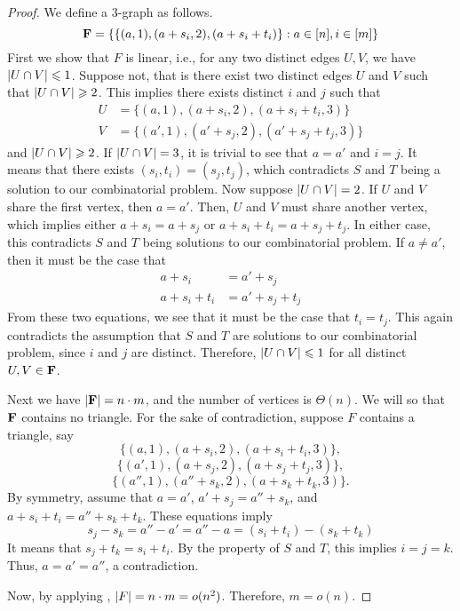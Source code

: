 \begin{proof}
	We define a 3-graph as follows. 
	$$ {\mathbf F} = \{ \{(a,1), (a+s_i, 2), (a + s_i + t_i)\} : a \in [n], i \in [m] \} $$
	First we show that $ F $ is linear, i.e., for any two distinct edges $ U,V $, we have $ \left\vert{U \cap V}\right\vert \leqslant 1 $. Suppose not, that is there exist two distinct edges $U$ and $V$ such that $\abs{U\intersect V} \geq 2$. This implies there exists distinct $i$ and $j$ such that
	\begin{align*}
		U &= \{ (a,1), (a+s_i,2), (a+s_i + t_i, 3) \}\\
		V &= \{ (a',1), (a'+s_j,2), (a'+s_j+t_j,3) \}
	\end{align*}
	and $\left\vert{U\cap V}\right\vert \geqslant 2$. If $\left\vert{U\cap V}\right\vert = 3$, it is trivial to see that $a=a'$ and $i=j$. It means that there exists $(s_i,t_i) = (s_j,t_j)$, which contradicts $S$ and $T$ being a solution to our combinatorial problem. Now suppose $\left\vert{U\cap V}\right\vert = 2$. If $U$ and $V$ share the first vertex, then $a = a'$. Then, $U$ and $V$ must share another vertex, which implies either $a+s_i = a+s_j$ or $a+s_i+t_i = a+s_j+t_j$. In either case, this contradicts $S$ and $T$ being solutions to our combinatorial problem. If $a\neq a'$, then it must be the case that
	\begin{align*}
		a+s_i &= a'+s_j\\
		a+s_i+t_i &= a'+s_j+t_j
	\end{align*}
	From these two equations, we see that it must be the case that $t_i = t_j$. This again contradicts the assumption that $S$ and $T$ are solutions to our combinatorial problem, since $i$ and $j$ are distinct. Therefore, $\left\vert{U\cap V}\right\vert \leqslant 1$ for all distinct $U, V \in {\mathbf F}$.
	
	Next we have $ \left\vert{\ensuremath{{\mathbf F}}}\right\vert = n \cdot m$, and the number of vertices is $ \Theta(n) $. We will so that $ {\mathbf F} $ contains no triangle. For the sake of contradiction, suppose $ F $ contains a triangle, say
	$$  \{ (a, 1), (a+s_i, 2), (a+ s_i + t_i, 3)\}, $$
	$$ \{ (a', 1), (a+s_j, 2), (a+ s_j + t_j, 3)\}, $$
	$$ \{ (a'', 1), (a''+s_k, 2), (a+ s_k + t_k, 3)\}. $$
	By symmetry, assume that $ a = a'$, $a' + s_j = a'' + s_k$, and $a + s_i+ t_i = a'' + s_k + t_k $.
	These equations imply
	$$ s_j - s_k = a'' - a' = a'' - a = (s_i + t_i) - (s_k + t_k)$$
	It means that $ s_j + t_k = s_i + t_i $. By the property of $ S $ and $ T $, this implies $  i = j = k $. Thus, $ a = a' = a'' $, a contradiction.
	
	Now, by applying , $ \left\vert{F}\right\vert = n \cdot m = o(n^2) $. Therefore, $ m = o(n) $. 
\end{proof}


